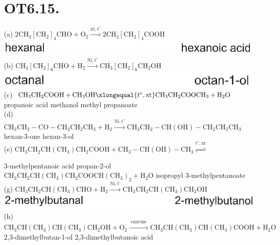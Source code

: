 \documentclass[10pt]{article}
\begin{document}
\section*{OT6.15.}
(a) $2 \mathrm{CH}_{3}\left[\mathrm{CH}_{2}\right]_{4} \mathrm{CHO}+\mathrm{O}_{2} \xrightarrow{\mathrm{xt}, \mathrm{t}^{\circ}} 2 \mathrm{CH}_{3}\left[\mathrm{CH}_{2}\right]_{4} \mathrm{COOH}$\\
\includegraphics[max width=\textwidth, center]{2025_10_23_adad5b98d65ac6665838g-45(2)}\\
(b) $\mathrm{CH}_{3}\left[\mathrm{CH}_{2}\right]_{6} \mathrm{CHO}+\mathrm{H}_{2} \xrightarrow{\mathrm{Ni}, \mathrm{t}^{\circ}} \mathrm{CH}_{3}\left[\mathrm{CH}_{2}\right]_{6} \mathrm{CH}_{2} \mathrm{OH}$\\
\includegraphics[max width=\textwidth, center]{2025_10_23_adad5b98d65ac6665838g-45(1)}\\
(c) $\mathrm{CH}_{3} \mathrm{CH}_{2} \mathrm{COOH}+\mathrm{CH}_{3} \mathrm{OH} \xlongequal{t^{\circ}, \mathrm{xt}} \mathrm{CH}_{3} \mathrm{CH}_{2} \mathrm{COOCH}_{3}+\mathrm{H}_{2} \mathrm{O}$ propanoic acid methanol methyl propanoate\\
(d) $\mathrm{CH}_{3} \mathrm{CH}_{2}-\mathrm{CO}-\mathrm{CH}_{2} \mathrm{CH}_{2} \mathrm{CH}_{3}+\mathrm{H}_{2} \xrightarrow{\mathrm{Ni}, \mathrm{t}^{\circ}} \mathrm{CH}_{3} \mathrm{CH}_{2}-\mathrm{CH}(\mathrm{OH})-\mathrm{CH}_{2} \mathrm{CH}_{2} \mathrm{CH}_{3}$ hexan-3-one hexan-3-ol\\
(e) $\mathrm{CH}_{3} \mathrm{CH}_{2} \mathrm{CH}\left(\mathrm{CH}_{3}\right) \mathrm{CH}_{2} \mathrm{COOH}+\mathrm{CH}_{3}-\mathrm{CH}(\mathrm{OH})-\mathrm{CH}_{3} \stackrel{\mathrm{t}^{\circ}, \mathrm{xt}}{\rightleftharpoons}$

3-methylpentanoic acid propan-2-ol $\mathrm{CH}_{3} \mathrm{CH}_{2} \mathrm{CH}\left(\mathrm{CH}_{3}\right) \mathrm{CH}_{2} \mathrm{COOCH}\left(\mathrm{CH}_{3}\right)_{2}+\mathrm{H}_{2} \mathrm{O}$ isopropyl 3-methylpentanoate\\
(g) $\mathrm{CH}_{3} \mathrm{CH}_{2} \mathrm{CH}\left(\mathrm{CH}_{3}\right) \mathrm{CHO}+\mathrm{H}_{2} \xrightarrow{\mathrm{Ni}, \mathrm{t}^{\circ}} \mathrm{CH}_{3} \mathrm{CH}_{2} \mathrm{CH}\left(\mathrm{CH}_{3}\right) \mathrm{CH}_{2} \mathrm{OH}$\\
\includegraphics[max width=\textwidth, center]{2025_10_23_adad5b98d65ac6665838g-45}\\
(h) $\mathrm{CH}_{3} \mathrm{CH}\left(\mathrm{CH}_{3}\right) \mathrm{CH}\left(\mathrm{CH}_{3}\right) \mathrm{CH}_{2} \mathrm{OH}+\mathrm{O}_{2} \xrightarrow{\text { enzyme }} \mathrm{CH}_{3} \mathrm{CH}\left(\mathrm{CH}_{3}\right) \mathrm{CH}\left(\mathrm{CH}_{3}\right) \mathrm{COOH}+\mathrm{H}_{2} \mathrm{O}$ 2,3-dimethylbutan-1-ol 2,3-dimethylbutanoic acid
\end{document}
